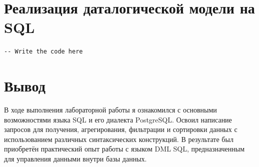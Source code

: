 \documentclass[12pt, a4paper]{article}
\begin{document}
\section{Реализация даталогической модели на SQL}




\begin{verbatim}
-- Write the code here 
\end{verbatim}

\section{Вывод}

В ходе выполнения лабораторной работы я ознакомился с основными возможностями языка SQL и его диалекта PostgreSQL. Освоил написание запросов для получения, агрегирования, фильтрации и сортировки данных с использованием различных синтаксических конструкций. В результате был приобретён практический опыт работы с языком DML SQL, предназначенным для управления данными внутри базы данных.
\end{document}
